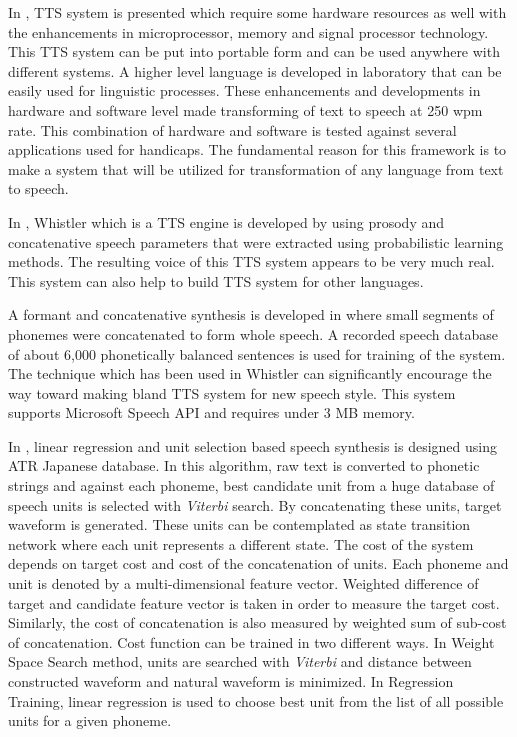 In \cite{carlson1982multi}, TTS system is presented which require some hardware resources as well with the enhancements in microprocessor, memory and signal processor technology. This TTS system can be put into portable form and can be used anywhere with different systems. A higher level language is developed in laboratory that can be easily used for linguistic processes. These enhancements and developments in hardware and software level made transforming of text to speech at 250 wpm rate. This combination of hardware and software is tested against several applications used for handicaps. The fundamental reason for this framework is to make a system that will be utilized for transformation of any language from text to speech. 

In \cite{huang1996whistler}, Whistler which is a TTS engine is developed by using prosody and concatenative speech parameters that were extracted using probabilistic learning methods. The resulting voice of this TTS system appears to be very much real. This system can also help to build TTS system for other languages.

A formant and concatenative synthesis is developed in \cite{huang1997recent} where small segments of phonemes were concatenated to form whole speech. A recorded speech database of about 6,000 phonetically balanced sentences is used for training of the system. The technique which has been used in Whistler \cite{huang1996whistler} can significantly encourage the way toward making bland TTS system for new speech style. This system supports Microsoft Speech API \cite{ms_speech_api} and requires under 3 MB memory.

In \cite{hunt1996unit}, linear regression and unit selection based speech synthesis is designed using ATR Japanese database. In this algorithm, raw text is converted to phonetic strings and against each phoneme, best candidate unit from a huge database of speech units is selected with \textit{Viterbi} search. By concatenating these units, target waveform is generated. These units can be contemplated as state transition network where each unit represents a different state. The cost of the system depends on target cost and cost of the concatenation of units. Each phoneme and unit is denoted by a multi-dimensional feature vector. Weighted difference of target and candidate feature vector is taken in order to measure the target cost. Similarly, the cost of concatenation is also measured by weighted sum of sub-cost of concatenation. Cost function can be trained in two different ways. In Weight Space Search method, units are searched with \textit{Viterbi} and distance between constructed waveform and natural waveform is minimized. In Regression Training, linear regression is used to choose best unit from the list of all possible units for a given phoneme.

